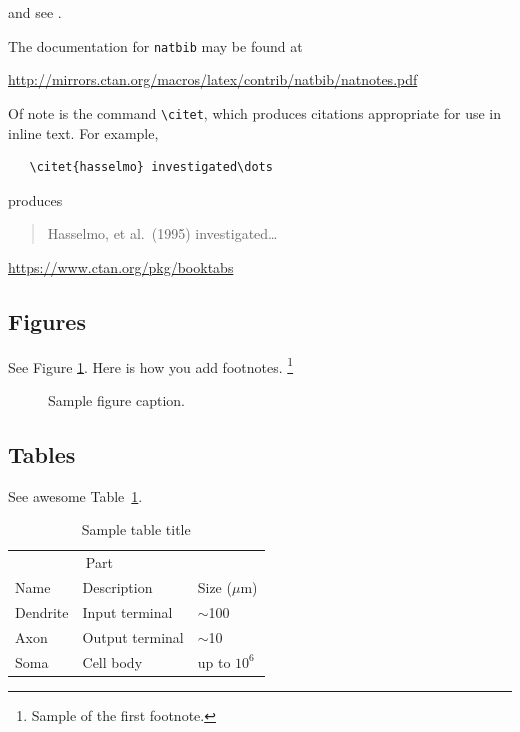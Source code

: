 \documentclass{article}
\begin{document}
 \cite{kour2014real,kour2014fast} and see \cite{hadash2018estimate}.

The documentation for \verb+natbib+ may be found at
\begin{center}
  \url{http://mirrors.ctan.org/macros/latex/contrib/natbib/natnotes.pdf}
\end{center}
Of note is the command \verb+\citet+, which produces citations
appropriate for use in inline text.  For example,
\begin{verbatim}
   \citet{hasselmo} investigated\dots
\end{verbatim}
produces
\begin{quote}
  Hasselmo, et al.\ (1995) investigated\dots
\end{quote}

\begin{center}
  \url{https://www.ctan.org/pkg/booktabs}
\end{center}


\subsection{Figures}
\lipsum[10] 
See Figure \ref{fig:fig1}. Here is how you add footnotes. \footnote{Sample of the first footnote.}
\lipsum[11] 

\begin{figure}
  \centering
  \fbox{\rule[-.5cm]{4cm}{4cm} \rule[-.5cm]{4cm}{0cm}}
  \caption{Sample figure caption.}
  \label{fig:fig1}
\end{figure}

\subsection{Tables}
\lipsum[12]
See awesome Table~\ref{tab:table}.

\begin{table}
 \caption{Sample table title}
  \centering
  \begin{tabular}{lll}
    \toprule
    \multicolumn{2}{c}{Part}                   \\
    \cmidrule(r){1-2}
    Name     & Description     & Size ($\mu$m) \\
    \midrule
    Dendrite & Input terminal  & $\sim$100     \\
    Axon     & Output terminal & $\sim$10      \\
    Soma     & Cell body       & up to $10^6$  \\
    \bottomrule
  \end{tabular}
  \label{tab:table}
\end{table}
\end{document}
